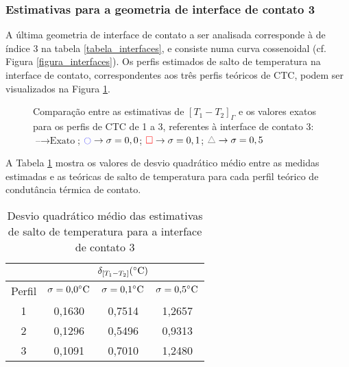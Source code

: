 \subsubsection{Estimativas para a geometria de interface de contato 3}

A última geometria de interface de contato a ser analisada corresponde à de índice 3 na tabela \ref{tabela_interfaces}, e consiste numa curva cossenoidal (cf. Figura \ref{figura_interfaces}).  Os perfis estimados de salto de temperatura na interface de contato, correspondentes aos três perfis teóricos de CTC, podem ser visualizados na Figura \ref{figura_delta_temperaturas_interface_03}.

\begin{figure}[H]
	\caption{Comparação entre as estimativas de $[T_1 - T_2]_\Gamma$ e os valores exatos para os perfis de CTC de 1 a 3, referentes à interface de contato 3: $\text{--} \rightarrow \text{Exato}$; $\textcolor{blue}{\ocircle} \rightarrow \sigma = 0,0$; $\textcolor{red}{\square} \rightarrow \sigma = 0,1$; $\textcolor{gray}{\triangle} \rightarrow \sigma = 0,5$}
	\label{figura_delta_temperaturas_interface_03}
\end{figure}

A Tabela \ref{tabela_rms_delta_temperaturas_interface_3} mostra os valores de desvio quadrático médio entre as medidas estimadas e as teóricas de salto de temperatura para cada perfil teórico de condutância térmica de contato.
\begin{table}[H]
	\centering
	\caption{Desvio quadrático médio das estimativas de salto de temperatura para a interface de contato 3}
	\begin{tabular}{c|c|c|c|}
		\cline{2-4}
		& \multicolumn{3}{c|}{$\delta_{[T_1 - T_2]} (\celsius)$} \\ \hline
		\multicolumn{1}{|c|}{Perfil} & $\sigma = \text{0,0}\celsius$   & $\sigma = \text{0,1}\celsius$    & $\sigma = \text{0,5}\celsius$  \\ \hline
		\multicolumn{1}{|c|}{1}      & 0,1630       & 0,7514       & 1,2657      \\ \hline
		\multicolumn{1}{|c|}{2}      & 0,1296       & 0,5496       & 0,9313      \\ \hline
		\multicolumn{1}{|c|}{3}      & 0,1091       & 0,7010       & 1,2480      \\ \hline
	\end{tabular}
	\label{tabela_rms_delta_temperaturas_interface_3}
\end{table}

